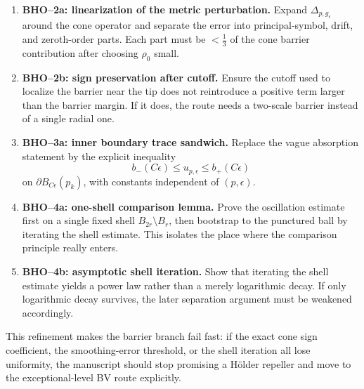 \begin{remark}
\begin{enumerate}
    \item \textbf{BHO--2a: linearization of the metric perturbation.}
    Expand \(\Delta_{p,g_\epsilon}\) around the cone operator and separate the
    error into principal-symbol, drift, and zeroth-order parts.  Each part must
    be \(<\frac13\) of the cone barrier contribution after choosing
    \(\rho_0\) small.

    \item \textbf{BHO--2b: sign preservation after cutoff.}
    Ensure the cutoff used to localize the barrier near the tip does not
    reintroduce a positive term larger than the barrier margin.  If it does,
    the route needs a two-scale barrier instead of a single radial one.

    \item \textbf{BHO--3a: inner boundary trace sandwich.}
    Replace the vague absorption statement by the explicit inequality
    \[
        b_-(C\epsilon)\le u_{p,\epsilon}\le b_+(C\epsilon)
    \]
    on \(\partial B_{C\epsilon}(p_k)\), with constants independent of
    \((p,\epsilon)\).

    \item \textbf{BHO--4a: one-shell comparison lemma.}
    Prove the oscillation estimate first on a single fixed shell
    \(B_{2r}\setminus B_r\), then bootstrap to the punctured ball by
    iterating the shell estimate.  This isolates the place where the
    comparison principle really enters.

    \item \textbf{BHO--4b: asymptotic shell iteration.}
    Show that iterating the shell estimate yields a power law rather than a
    merely logarithmic decay.  If only logarithmic decay survives, the later
    separation argument must be weakened accordingly.
\end{enumerate}
This refinement makes the barrier branch fail fast: if the exact cone sign
coefficient, the smoothing-error threshold, or the shell iteration all lose
uniformity, the manuscript should stop promising a Hölder repeller and move to
the exceptional-level BV route explicitly.
\end{remark}

